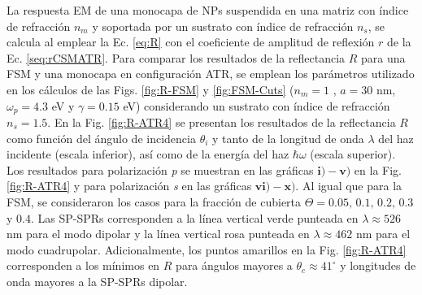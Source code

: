 La respuesta EM de una monocapa de NPs suspendida en una matriz con índice de refracción $n_m$ y soportada por un sustrato con índice de refracción $n_s$, se calcula al emplear la Ec.  \eqref{eq:R} con el coeficiente de amplitud de reflexión $r$ de la Ec.  \eqref{seq:rCSMATR}. Para comparar los resultados de la reflectancia $R$ para una FSM y una monocapa en configuración ATR, se emplean los parámetros utilizado en los cálculos de las Figs. \ref{fig:R-FSM} y \ref{fig:FSM-Cuts} ($n_m=1$ , $a=30$ nm, $\omega_p=4.3$ eV y  $\gamma = 0.15$ eV) considerando un sustrato con índice de refracción $n_s=1.5$. En la Fig.  \ref{fig:R-ATR4} se presentan los resultados de la reflectancia $R$ como función del ángulo de incidencia $\theta_i$ y tanto de la longitud de onda $\lambda$ del haz incidente (escala inferior), así como de la energía del haz $\hbar\omega$ (escala superior). Los resultados para polarización \emph{p} se muestran en las gráficas $\mathbf{i)-v)}$ en la Fig.  \ref{fig:R-ATR4} y para polarización \emph{s} en las gráficas $\mathbf{vi)-x)}$. Al igual que para la FSM, se consideraron los casos para la fracción de cubierta $\Theta = 0.05,\,0.1,\,0.2,\,0.3$ y $0.4$. Las SP-SPRs corresponden a la línea vertical verde punteada en $\lambda \approx 526$ nm para el modo dipolar y la línea vertical rosa punteada en  $\lambda \approx 462$ nm para el modo cuadrupolar. Adicionalmente, los puntos amarillos en la Fig. \ref{fig:R-ATR4} corresponden a los mínimos en $R$ para ángulos mayores a $\theta_c\approx 41^\circ$ y longitudes de onda mayores a la SP-SPRs dipolar.


